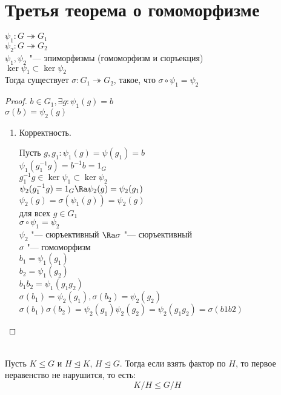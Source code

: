 ﻿\section{Третья теорема о гомоморфизме}
\begin{theorem}
$\psi_1 \colon G \twoheadrightarrow G_1$ \\
$\psi_2 \colon G \twoheadrightarrow G_2$ \\
$\psi_1, \psi_2$ "--- эпиморфизмы (гомоморфизм и сюръекция)\\
$\ker \psi_1 \subset \ker \psi_2$\\
Тогда существует $\sigma \colon G_1 \twoheadrightarrow G_2$, такое, что $\sigma \circ \psi_1 = \psi_2$\\
\end{theorem}
\begin{proof}
$b \in G_1, \exists g \colon \psi_1(g) = b$\\
$\sigma (b) = \psi_2(g)$\\

\begin{enumerate}
\item Корректность.

Пусть $g, g_1 \colon \psi_1(g) = \psi(g_1) = b$\\
$\psi_1(g_1^{-1}g) = b^{-1}b = 1_G$\\
$g_1^{-1}g \in \ker \psi_1 \subset \ker \psi_2$\\
$\psi_2(g_1^{-1}g) = 1_G \Ra \psi_2(g) = \psi_2(g_1)$\\

$\psi_2(g) = \sigma(\psi_1(g)) = \psi_2(g)$\\
для всех $g \in G_1$\\
$\sigma \circ \psi_1 = \psi_2$\\
$\psi_2$ "--- сюръективный $\Ra \sigma$ "--- сюръективный\\

$\sigma$ "--- гомоморфизм\\
$b_1 = \psi_1(g_1)$\\
$b_2 = \psi_1(g_2)$\\
$b_1b_2 = \psi_1(g_1g_2)$\\

$\sigma(b_1) = \psi_2(g_1), \sigma(b_2) = \psi_2(g_2)$\\
$\sigma(b_1)\sigma(b_2) = \psi_2(g_1) \psi_2(g_2) = \psi_2(g_1g_2) = \sigma(b1b2)$\\
\end{enumerate}
\end{proof}
\begin{Rem} \hfill\\
Пусть $K \le G$ и $H \unlhd K$, $H \unlhd G$.
Тогда если взять фактор по $H$, то первое неравенство не нарушится, то есть:
\[ K/H \le G / H \]
\end{Rem}

